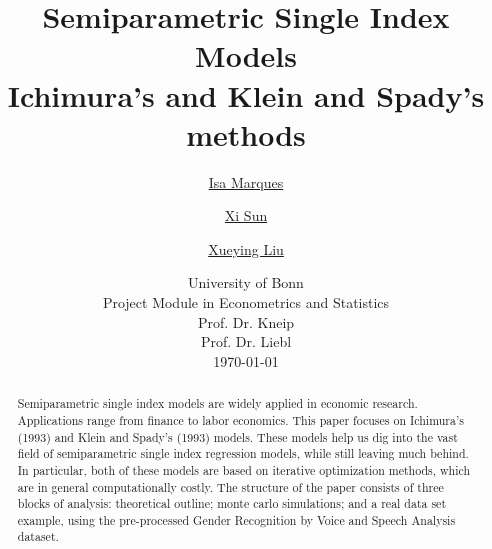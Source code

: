 \documentclass[a4paper]{article}
\begin{document}
	\title{
	\vspace{1cm}
	\Huge \textbf{ Semiparametric Single Index Models }\\ \Large Ichimura's and Klein and Spady's methods \\
	}
	
	\vspace{1cm}
	
	
	\author{\Large \href{mailto:first.student@smail.fh-koeln.de}{Isa Marques}\and \Large \href{mailto:second.student@smail.fh-koeln.de}{Xi Sun} \and \Large \href{mailto:second.student@smail.fh-koeln.de}{Xueying Liu}
	\vspace{1cm}}
	
	\date{
	\large University of Bonn \\ Project Module in Econometrics and Statistics\\ 
	\vspace{0.8cm}
	\large Prof. Dr. Kneip \\
	\large Prof. Dr. Liebl \\
	\vspace{1cm}
	\today
	}

	\maketitle
	\setlength{\parindent}{0pt}

\vspace{2cm}
\begin{abstract}

Semiparametric single index models are widely applied in economic research. Applications range from finance to labor economics. This paper focuses on Ichimura's (1993) and Klein and Spady's (1993) models. These models help us dig into the vast field of semiparametric single index regression models, while still leaving much behind. In particular, both of these models are based on iterative optimization methods, which are in general computationally costly. The structure of the paper consists of three blocks of analysis: theoretical outline; monte carlo simulations; and a real data set example, using the pre-processed Gender Recognition by Voice and Speech Analysis dataset.

\end{abstract}
	\newpage
	
\end{document}
